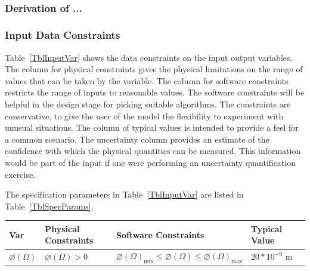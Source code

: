 \documentclass[12pt]{article}
\begin{document}


~\newline

\subsubsection*{Derivation of ...}





\subsubsection{Input Data Constraints} \label{sec_DataConstraints}    

Table~\ref{TblInputVar} shows the data constraints on the input output
variables.  The column for physical constraints gives the physical limitations
on the range of values that can be taken by the variable.  The column for
software constraints restricts the range of inputs to reasonable values.  The
software constraints will be helpful in the design stage for picking suitable
algorithms.  The constraints are conservative, to give the user of the model the
flexibility to experiment with unusual situations.  The column of typical values
is intended to provide a feel for a common scenario.  The uncertainty column
provides an estimate of the confidence with which the physical quantities can be
measured.  This information would be part of the input if one were performing an
uncertainty quantification exercise.

The specification parameters in Table~\ref{TblInputVar} are listed in
Table~\ref{TblSpecParams}.

\begin{table}[!h]
  \caption{Input Variables} \label{TblInputVar}
  \renewcommand{\arraystretch}{1.2}
\noindent \begin{longtable*}{l l l l c} 
  \toprule
  \textbf{Var} & \textbf{Physical Constraints} & \textbf{Software Constraints} &
                             \textbf{Typical Value} \\
  \midrule 
  $\varnothing(\Omega)$ & $\varnothing(\Omega) > 0$ & $\varnothing(\Omega)_{\text{min}} \leq \varnothing(\Omega) \leq \varnothing(\Omega)_{\text{max}}$ & $20*10^{-9}$ \si[per-mode=symbol] {\metre} 
  \\
  \bottomrule
\end{longtable*}
\end{table}
\end{document}
